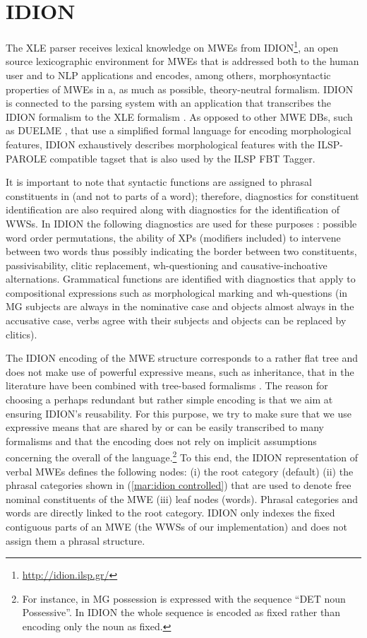 \documentclass[output=paper]{langsci/langscibook}
\begin{document}
\section{IDION}

The XLE parser  receives lexical knowledge on MWEs from IDION\footnote{\url{http://idion.ilsp.gr/}}, an open source lexicographic environment for MWEs that is addressed both to the human user and to NLP applications and encodes, among others, morphosyntactic properties of MWEs in a, as much as possible, theory-neutral formalism. IDION is connected to the parsing system with an application that transcribes the IDION formalism to the XLE formalism \citep{minos2016}.  
As opposed to other MWE DBs, such as DUELME \citep{gregoire:10}, that use a simplified formal language for encoding morphological features, IDION exhaustively describes morphological features with the ILSP-PAROLE compatible tagset that is also used by the ILSP FBT Tagger. 

It is important to note that syntactic functions are assigned to phrasal constituents in  (and not to parts of a word); therefore, diagnostics for constituent identification are also required along with diagnostics for the identification of WWSs.  In IDION the following diagnostics are used for these purposes \citep{markantonatou2017}: possible word order permutations, the ability of XPs (modifiers included) to intervene between two words thus possibly indicating the border between two constituents, passivisability, clitic replacement, wh-questioning and causative-inchoative alternations. Grammatical functions are identified with diagnostics that apply to compositional expressions such as morphological marking and wh-questions (in MG subjects are always in the nominative case and objects almost always in the accusative case, verbs agree with their subjects and objects can be replaced by clitics).

The IDION encoding of the MWE structure corresponds to a rather flat tree and does not make use of powerful expressive means, such as inheritance, that in the literature have been combined with tree-based formalisms \citep{hpsg1,crabbe:etal:13}. The reason for choosing a perhaps redundant but rather simple encoding is that we aim at ensuring IDION's reusability. For this purpose, we try to make sure that we use expressive means that are shared by or can be easily transcribed to many formalisms and that the encoding does not rely on implicit assumptions concerning the overall  of the language.\footnote{For instance, in MG possession is expressed with the sequence ``DET noun Possessive''. In IDION  the whole sequence is encoded as fixed rather than encoding only the noun as fixed.} To this end, the IDION representation of verbal MWEs defines the following nodes: (i) the root category (default) (ii) the phrasal categories shown in (\ref{mar:idion controlled}) that are used to denote free nominal constituents of the MWE (iii) leaf nodes (words). Phrasal categories and words are directly linked to the root category.  IDION only indexes the fixed contiguous parts of an MWE (the WWSs of our implementation) and does not assign them a phrasal structure.
\end{document}
